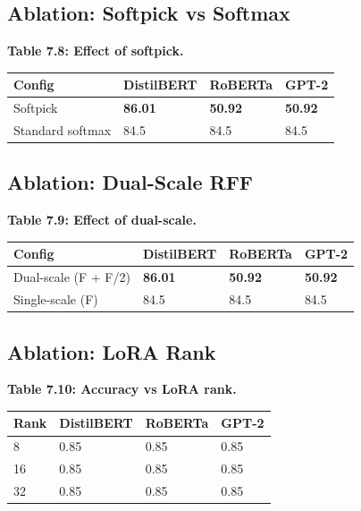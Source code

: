 \subsection{Ablation: Softpick vs Softmax}

\textbf{Table 7.8: Effect of softpick.}

\begin{table}[H]
\centering
\small
\begin{tabular}{llll}
\toprule
\textbf{Config} & \textbf{DistilBERT} & \textbf{RoBERTa} & \textbf{GPT-2} \\
\midrule
Softpick & \textbf{86.01} & \textbf{50.92} & \textbf{50.92} \\
Standard softmax & 84.5 & 84.5 & 84.5 \\
\bottomrule
\end{tabular}
\end{table}

\subsection{Ablation: Dual-Scale RFF}

\textbf{Table 7.9: Effect of dual-scale.}

\begin{table}[H]
\centering
\small
\begin{tabular}{llll}
\toprule
\textbf{Config} & \textbf{DistilBERT} & \textbf{RoBERTa} & \textbf{GPT-2} \\
\midrule
Dual-scale (F + F/2) & \textbf{86.01} & \textbf{50.92} & \textbf{50.92} \\
Single-scale (F) & 84.5 & 84.5 & 84.5 \\
\bottomrule
\end{tabular}
\end{table}

\subsection{Ablation: LoRA Rank}

\textbf{Table 7.10: Accuracy vs LoRA rank.}

\begin{table}[H]
\centering
\small
\begin{tabular}{llll}
\toprule
\textbf{Rank} & \textbf{DistilBERT} & \textbf{RoBERTa} & \textbf{GPT-2} \\
\midrule
8 & 0.85 & 0.85 & 0.85 \\
16 & 0.85 & 0.85 & 0.85 \\
32 & 0.85 & 0.85 & 0.85 \\
\bottomrule
\end{tabular}
\end{table}


